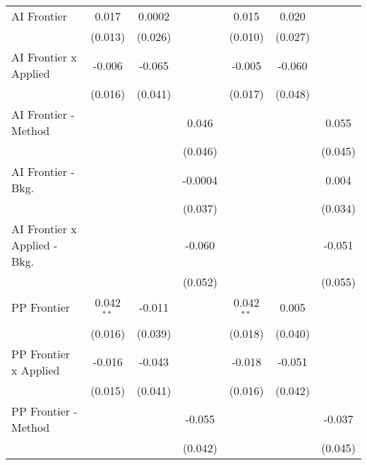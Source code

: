 \begin{tabular}{lcccccc}
   AI Frontier                    & 0.017         & 0.0002       &               & 0.015         & 0.020        &   \\   
                                  & (0.013)       & (0.026)      &               & (0.010)       & (0.027)      &   \\   
   AI Frontier x Applied          & -0.006        & -0.065       &               & -0.005        & -0.060       &   \\   
                                  & (0.016)       & (0.041)      &               & (0.017)       & (0.048)      &   \\   
   AI Frontier - Method           &               &              & 0.046         &               &              & 0.055\\   
                                  &               &              & (0.046)       &               &              & (0.045)\\   
   AI Frontier - Bkg.             &               &              & -0.0004       &               &              & 0.004\\   
                                  &               &              & (0.037)       &               &              & (0.034)\\   
   AI Frontier x Applied - Bkg.   &               &              & -0.060        &               &              & -0.051\\   
                                  &               &              & (0.052)       &               &              & (0.055)\\   
   PP Frontier                    & 0.042$^{**}$  & -0.011       &               & 0.042$^{**}$  & 0.005        &   \\   
                                  & (0.016)       & (0.039)      &               & (0.018)       & (0.040)      &   \\   
   PP Frontier x Applied          & -0.016        & -0.043       &               & -0.018        & -0.051       &   \\   
                                  & (0.015)       & (0.041)      &               & (0.016)       & (0.042)      &   \\   
   PP Frontier - Method           &               &              & -0.055        &               &              & -0.037\\   
                                  &               &              & (0.042)       &               &              & (0.045)\\   

\end{tabular}
